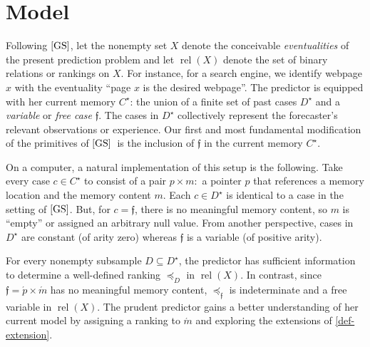 \documentclass[12pt,a4paper,twoside]{article}
\newcommand{\gsii}{$\textup{[GS]}$}
\newcommand{\relations}{\operatorname{rel}}
\newcommand{\novel}{\mathfrak f}
\newcommand{\preceqb}{\mathbin{\preceq}}
\newcommand{\current}{{C^\star}}
\newcommand{\past}{{D^\star}}
\begin{document}
\section{Model}\label{sec-model}
Following \gsii, let the nonempty set $X$ denote the conceivable
\emph{eventualities} of the present prediction problem and let $ \relations(X)$
denote the set of binary relations or rankings on $X$.  For instance, for a
search engine, we identify webpage $x$ with the eventuality ``page $x$ is the
desired webpage''.  The predictor is equipped with her current memory
$\current$: the union of a finite set of past cases $\past$ and a
\emph{variable} or \emph{free case} $\novel$.  The cases in $\past$ collectively
represent the forecaster's relevant observations or experience.  Our first and
most fundamental modification of the primitives of \gsii~is the inclusion of
$\novel$ in the current memory
$\current$.  %
\begin{remark*}On a computer, a natural implementation of this setup is the
  following.  Take every case $c \in \current $ to consist of a pair
  $p \times m:$ a pointer $p$ that references a memory location and the memory
  content $m$. Each $c\in \past$ is identical to a case in the setting of
  \gsii. But, for $c = \novel$, there is no meaningful memory content, so $m$ is
  ``empty'' or assigned an arbitrary null value.  From another perspective,
  cases in $ \past$ are constant (of arity zero) whereas $\novel$ is a variable
  (of positive arity).

  For every nonempty subsample $ D \subseteq \past $, the predictor has
  sufficient information to determine a well-defined ranking $\preceqb_ D $ in
  $ \relations(X)$.  In contrast, since $\novel = \acute{p} \times \acute{m}$
  has no meaningful memory content, $\preceqb_\novel$ is indeterminate and a
  free variable in $\relations(X)$. The prudent predictor gains a better
  understanding of her current model by assigning a ranking to $\acute{m}$ and
  exploring the extensions of \cref{def-extension}.
\end{remark*}
\end{document}

